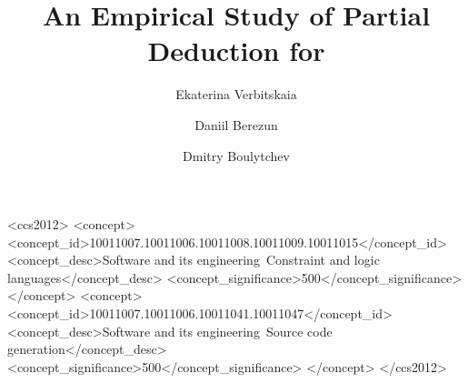 \documentclass[final,acmlarge,draft=false,review=false,nonacm=false]{acmart}
\begin{document}
\title{An Empirical Study of Partial Deduction for \mk{}}


\author{Ekaterina Verbitskaia}

\author{Daniil Berezun}

\author{Dmitry Boulytchev}




\renewcommand{\shortauthors}{Verbitskaia, Berezun and Boulytchev.}



\begin{CCSXML}
  <ccs2012>
  <concept>
  <concept_id>10011007.10011006.10011008.10011009.10011015</concept_id>
  <concept_desc>Software and its engineering~Constraint and logic languages</concept_desc>
  <concept_significance>500</concept_significance>
  </concept>
  <concept>
  <concept_id>10011007.10011006.10011041.10011047</concept_id>
  <concept_desc>Software and its engineering~Source code generation</concept_desc>
  <concept_significance>500</concept_significance>
  </concept>
  </ccs2012>
\end{CCSXML}


\maketitle
\thispagestyle{empty}









\end{document}

